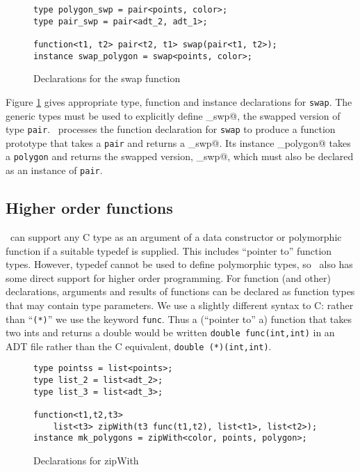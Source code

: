 \begin{figure}[!ht]
\begin{verbatim}
type polygon_swp = pair<points, color>;
type pair_swp = pair<adt_2, adt_1>;

function<t1, t2> pair<t2, t1> swap(pair<t1, t2>);
instance swap_polygon = swap<points, color>;
\end{verbatim}
\caption{Declarations for the swap function}
\label{fig:swapdec}
\end{figure}

Figure \ref{fig:swapdec} gives appropriate type, function and instance
declarations for \texttt{swap}.  The generic types must be used to
explicitly define \verb@pair_swp@, the swapped version of type \texttt{pair}.
\Adtpp\ processes the function declaration for \texttt{swap} to produce
a function
prototype that takes a \texttt{pair} and returns a \verb@pair_swp@.  Its
instance \verb@swap_polygon@ takes a \texttt{polygon} and returns the
swapped version, \verb@polygon_swp@, which must also be declared as an
instance of \texttt{pair}.

\subsection{Higher order functions}
\label{sec-ho}

\Adtpp\ can support any C type as an argument of a data constructor or
polymorphic function if a suitable typedef is supplied.  This includes
``pointer to'' function types.  However, typedef cannot be used to
define polymorphic types, so \adtpp\ also has some direct support for higher
order programming.  For function (and other) declarations, arguments
and results of functions can be declared as function types that may
contain type parameters.  We use a slightly different syntax to C:
rather than ``\texttt{(*)}'' we use the keyword \texttt{func}.  Thus a
(``pointer to'' a) function that takes two ints and returns a double
would be written \texttt{double func(int,int)} in an ADT file rather
than the C equivalent, \texttt{double (*)(int,int)}.

\begin{figure}[!ht]
\begin{verbatim}
type pointss = list<points>;
type list_2 = list<adt_2>;
type list_3 = list<adt_3>;

function<t1,t2,t3>
    list<t3> zipWith(t3 func(t1,t2), list<t1>, list<t2>);
instance mk_polygons = zipWith<color, points, polygon>;
\end{verbatim}
\caption{Declarations for zipWith}
\label{fig:zipwithdec}
\end{figure}

